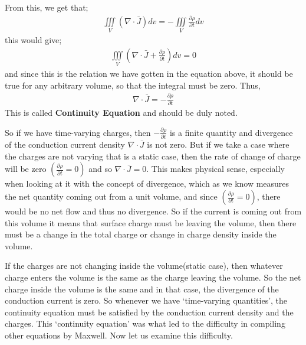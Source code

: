 From this, we get that;
\begin{align*}
\iiint\limits_V(\nabla\cdot\bar{J})dv = -\iiint\limits_V\frac{\partial\rho}{\partial t}dv
\end{align*}
this would give;
\begin{align*}
\iiint\limits_V(\nabla\cdot\bar{J} + \frac{\partial\rho}{\partial t} )dv = 0
\end{align*}
and since this is the relation we have gotten in the equation above, it should be true for any arbitrary volume, so that the integral must be zero. Thus,
\begin{align}
\nabla\cdot\bar{J} = -\frac{\partial\rho}{\partial t}
\end{align}
This is called \textbf{Continuity Equation} and should be duly noted.

So if we have time-varying charges, then $-\frac{\partial\rho}{\partial t}$ is a finite quantity and divergence of the conduction current density $\nabla\cdot\bar{J}$ is not zero. But if we take a case where the charges are not varying that is a static case, then the rate of change of charge will be zero $(\frac{\partial\rho}{\partial t}=0)$ and so $\nabla\cdot\bar{J}=0$. This makes physical sense, especially when looking at it with the concept of divergence, which as we know measures the net quantity coming out from a unit volume, and since $(\frac{\partial\rho}{\partial t}=0)$, there would be no net flow and thus no divergence. So if the current is coming out from this volume it means that surface charge must be leaving the volume, then there must be a change in the total charge or change in charge density inside the volume.

If the charges are not changing inside the volume(static case), then whatever charge enters the volume is the same as the charge leaving the volume. So the net charge inside the volume is the same and in that case, the divergence of the conduction current is zero. So whenever we have `time-varying quantities', the continuity equation must be satisfied by the conduction current density and the charges. This `continuity equation' was what led to the difficulty in compiling other equations by Maxwell. Now let us examine this difficulty.

